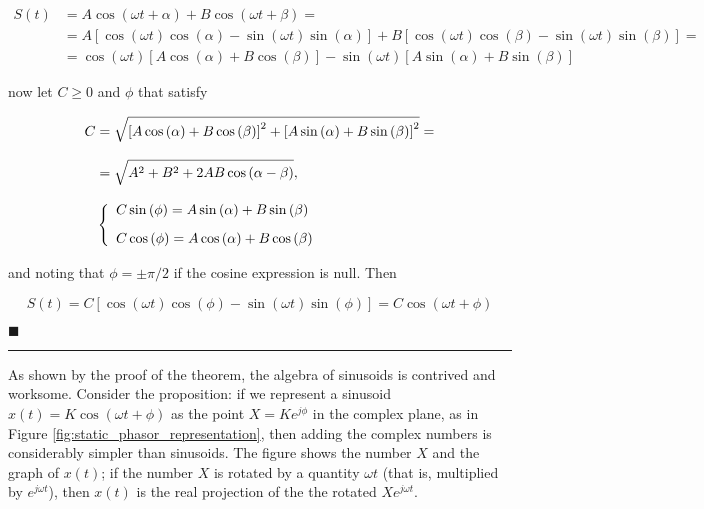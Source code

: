 \begin{align}
	S(t) &= A\cos\left(\omega t + \alpha\right) + B\cos\left(\omega t + \beta\right) = \nonumber\\[3mm]
%
	&= A\left[\cos\left(\omega t\right)\cos\left(\alpha\right) - \sin\left(\omega t\right)\sin\left(\alpha\right)\right] + B\left[\cos\left(\omega t\right)\cos\left(\beta\right) - \sin\left(\omega t\right)\sin\left(\beta\right)\right] = \nonumber\\[3mm]
%
	&= \cos\left(\omega t\right)\left[A\cos\left(\alpha\right) + B\cos\left(\beta\right)\right] - \sin\left(\omega t\right)\left[A\sin\left(\alpha\right) + B\sin\left(\beta\right)\right]
\end{align}

	\noindent now let $C \geq 0$ and $\phi$ that satisfy

\begin{align}
	C &= \sqrt{\left[A\cos\left(\alpha\right) + B\cos\left(\beta\right)\right]^2 + \left[A\sin\left(\alpha\right) + B\sin\left(\beta\right)\right]^2} = \\[3mm] &= \sqrt{\raisebox{3mm}[1mm][1mm]{} A^2 + B^2 + 2AB\cos\left(\alpha - \beta\right)}, \label{eq:sinesum_c} \\[3mm]
	& \left\{\begin{array}{l} C\sin\left(\phi\right) = A\sin\left(\alpha\right) + B\sin\left(\beta\right) \\[3mm]
				  C\cos\left(\phi\right) = A\cos\left(\alpha\right) + B\cos\left(\beta\right)\end{array}\right. \label{eq:sinesum_phi}
\end{align}

	\noindent and noting that $\phi = \pm \pi/2$ if the cosine expression is null. Then

\begin{equation} S(t) = C\left[\cos\left(\omega t\right)\cos\left(\phi\right) - \sin\left(\omega t\right)\sin\left(\phi\right)\right] = C\cos\left(\omega t + \phi\right) \label{eq:sinesum_final} \end{equation}

\hfill$\blacksquare$
\vspace{5mm}
\hrule
\vspace{5mm}

	As shown by the proof of the theorem, the algebra of sinusoids is contrived and worksome. Consider the proposition: if we represent a sinusoid $x(t) = K\cos\left(\omega t + \phi\right)$ as the point $X = Ke^{j\phi}$ in the complex plane, as in Figure \ref{fig:static_phasor_representation}, then adding the complex numbers is considerably simpler than sinusoids. The figure shows the number $X$ and the graph of $x(t)$; if the number $X$ is rotated by a quantity $\omega t$ (that is, multiplied by $e^{j\omega t}$), then $x(t)$ is the real projection of the the rotated $Xe^{j\omega t}$.

